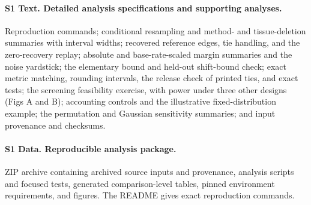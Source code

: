 \documentclass[10pt,letterpaper]{article}
\begin{document}
\paragraph{S1 Text. Detailed analysis specifications and supporting analyses.} Reproduction commands; conditional resampling and method- and tissue-deletion summaries with interval widths; recovered reference edges, tie handling, and the zero-recovery replay; absolute and base-rate-scaled margin summaries and the noise yardstick; the elementary bound and held-out shift-bound check; exact metric matching, rounding intervals, the release check of printed ties, and exact tests; the screening feasibility exercise, with power under three other designs (Figs A and B); accounting controls and the illustrative fixed-distribution example; the permutation and Gaussian sensitivity summaries; and input provenance and checksums.
\paragraph{S1 Data. Reproducible analysis package.} ZIP archive containing archived source inputs and provenance, analysis scripts and focused tests, generated comparison-level tables, pinned environment requirements, and figures. The README gives exact reproduction commands.
\end{document}
